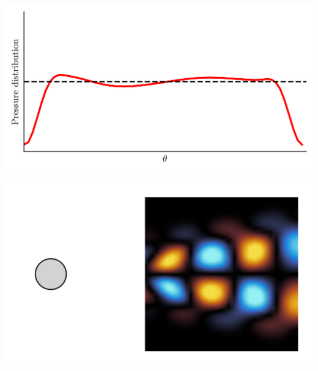 \documentclass[aspectratio=169, usenames, dvipsnames]{beamer}
\begin{document}
{\begin{frame}
  \begin{minipage}{.48\textwidth}
    \includegraphics[width=\textwidth]{pressure_distribution_cca_3}
  \end{minipage}%
  \hfill
  \begin{minipage}{.48\textwidth}
    \includegraphics[width=\textwidth]{vorticity_distribution_cca_3}
  \end{minipage}
  
  \vfill
\end{frame}


\begin{frame}
  \vfill
  

\end{frame}}
\end{document}
